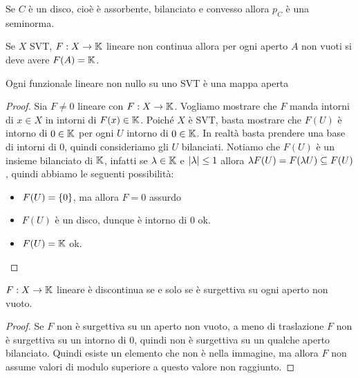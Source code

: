 \begin{remark}
    Se $C$ \`e un disco, cio\`e \`e assorbente, bilanciato e  convesso allora $p_C$ \`e una seminorma.
\end{remark}

\begin{exercise}
Se $X$ SVT, $F:X\to \mathbb{K}$ lineare non continua allora per ogni aperto $A$ non vuoti si deve avere $F(A)=\mathbb{K}$.
\end{exercise}

\begin{lemma}\label{LmFunzionaleLineareNonNulloSuSVTMappaAperta}
    Ogni funzionale lineare non nullo su uno SVT \`e una mappa aperta
\end{lemma}
\begin{proof}
Sia $F\neq0$ lineare con $F:X\to \mathbb{K}$. Vogliamo mostrare che $F$ manda intorni di $x\in X$ in intorni di $F(x)\in\mathbb{K}$. Poich\'e $X$ \`e SVT, basta mostrare che $F(U)$ \`e intorno di $0\in\mathbb{K}$ per ogni $U$ intorno di $0\in \mathbb{K}$. In realt\`a basta prendere una base di intorni di $0$, quindi consideriamo gli $U$ bilanciati. Notiamo che $F(U)$ \`e un insieme bilanciato di $\mathbb{K}$, infatti se $\lambda\in\mathbb{K}$ e $\left|{\lambda}\right|\leq 1$ allora $\lambda F(U)=F(\lambda U)\subseteq F(U)$, quindi abbiamo le seguenti possibilit\`a:
\begin{itemize}
    \item $F(U)=\left\{{0}\right\}$, ma allora $F=0$ assurdo
    \item $F(U)$ \`e un disco, dunque \`e intorno di $0$ ok.
    \item $F(U)=\mathbb{K}$ ok. 
\end{itemize}
\end{proof}
\begin{corollary}\label{CorDiscontinuitaFunzionaliLineari}
$F:X\to \mathbb{K}$ lineare \`e discontinua se e solo se \`e surgettiva su ogni aperto non vuoto.
\end{corollary}
\begin{proof}
Se $F$ non \`e surgettiva su un aperto non vuoto, a meno di traslazione $F$ non \`e surgettiva su un intorno di $0$, quindi non \`e surgettiva su un qualche aperto bilanciato. Quindi esiste un elemento che non \`e nella immagine, ma allora $F$ non assume valori di modulo superiore a questo valore non raggiunto.
\end{proof}


